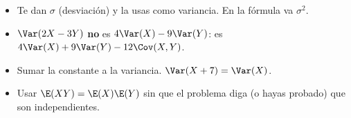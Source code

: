 \begin{trampa}
\begin{itemize}
\item Te dan $\sigma$ (desviaci\'on) y la usas como variancia. En la f\'ormula va $\sigma^2$.
\item $\Var(2X-3Y)$ \textbf{no} es $4\Var(X)-9\Var(Y)$: es $4\Var(X)+9\Var(Y)-12\Cov(X,Y)$.
\item Sumar la constante a la variancia. $\Var(X+7)=\Var(X)$.
\item Usar $\E(XY)=\E(X)\E(Y)$ sin que el problema diga (o hayas probado) que son independientes.
\end{itemize}
\end{trampa}
